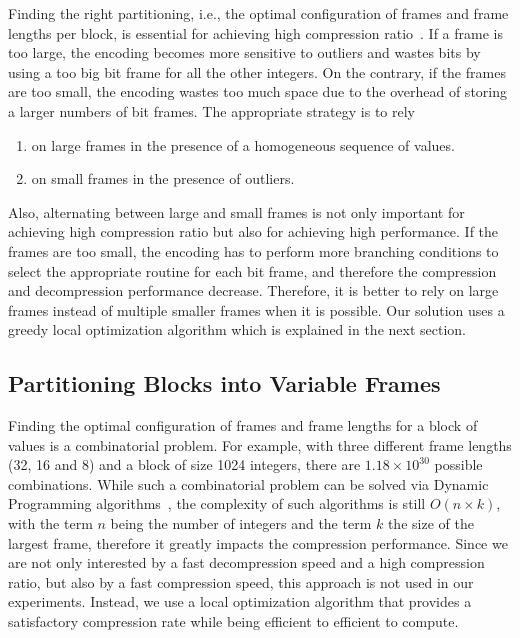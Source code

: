 Finding the right partitioning, i.e., the optimal configuration of frames and
frame lengths per block, is essential for achieving high compression
ratio~\cite{rossano:2010:vse}. If a frame is too large, the encoding becomes
more sensitive to outliers and wastes bits by using a too big bit frame for
all the other integers. On the contrary, if the frames are too small, the
encoding wastes too much space due to the overhead of storing a larger numbers
of bit frames. The appropriate strategy is to rely 
\begin{enumerate}
  \item on large frames in the presence of a homogeneous sequence of values.
  \item on small frames in the presence of outliers.
\end{enumerate}
Also, alternating
between large and small frames is not only important for achieving high
compression ratio but also for achieving high performance. If the frames are
too small, the encoding has to perform more branching conditions to select the
appropriate routine for each bit frame, and therefore the compression and
decompression performance decrease. Therefore, it is better to rely on large
frames instead of multiple smaller frames when it is possible. Our solution
uses a greedy local optimization algorithm which is explained in the next
section.

\subsection{Partitioning Blocks into Variable Frames}

Finding the optimal configuration of frames and frame lengths for a block of
values is a combinatorial problem. For example, with three different frame
lengths (32, 16 and 8) and a block of size 1024 integers, there are $1.18
\times 10^{30}$ possible combinations. While such a combinatorial problem can
be solved via Dynamic Programming algorithms~\cite{rossano:2010:vse}, the
complexity of such algorithms is still $O(n \times k)$, with the term $n$
being the number of integers and the term $k$ the size of the largest frame,
therefore it greatly impacts the compression performance. Since we are not
only interested by a fast decompression speed and a high compression ratio,
but also by a fast compression speed, this approach is not used in our
experiments. Instead, we use a local optimization algorithm that provides a
satisfactory compression rate while being efficient to efficient to compute.

